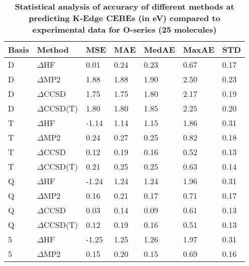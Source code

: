 \begin{table}
  \caption{\textbf{Statistical analysis of accuracy of different methods at predicting K-Edge CEBEs (in eV) compared to experimental data for O-series (25 molecules)}}
  \label{tbl:method-summary-o}
  \begin{tabular}{l l l l l l l }
    \toprule
    \textbf{Basis} & \textbf{Method} & \textbf{MSE} & \textbf{MAE} & \textbf{MedAE} & \textbf{MaxAE} & \textbf{STD} \\ 
    \midrule
    D & $\Delta$HF & 0.01 & 0.24 & 0.23 & 0.67 & 0.17 \\ 
    D & $\Delta$MP2 & 1.88 & 1.88 & 1.90 & 2.50 & 0.23 \\ 
    D & $\Delta$CCSD & 1.75 & 1.75 & 1.80 & 2.17 & 0.19 \\ 
    D & $\Delta$CCSD(T) & 1.80 & 1.80 & 1.85 & 2.25 & 0.20 \\ 
    T & $\Delta$HF & -1.14 & 1.14 & 1.15 & 1.86 & 0.31 \\ 
    T & $\Delta$MP2 & 0.24 & 0.27 & 0.25 & 0.82 & 0.18 \\ 
    T & $\Delta$CCSD & 0.12 & 0.19 & 0.16 & 0.52 & 0.13 \\ 
    T & $\Delta$CCSD(T) & 0.21 & 0.25 & 0.25 & 0.63 & 0.14 \\ 
    Q & $\Delta$HF & -1.24 & 1.24 & 1.24 & 1.96 & 0.31 \\ 
    Q & $\Delta$MP2 & 0.16 & 0.21 & 0.17 & 0.71 & 0.17 \\ 
    Q & $\Delta$CCSD & 0.03 & 0.14 & 0.09 & 0.61 & 0.13 \\ 
    Q & $\Delta$CCSD(T) & 0.12 & 0.19 & 0.16 & 0.51 & 0.13 \\ 
    5 & $\Delta$HF & -1.25 & 1.25 & 1.26 & 1.97 & 0.31 \\ 
    5 & $\Delta$MP2 & 0.15 & 0.20 & 0.15 & 0.69 & 0.16 \\ 
    \bottomrule
  \end{tabular}
\end{table}
